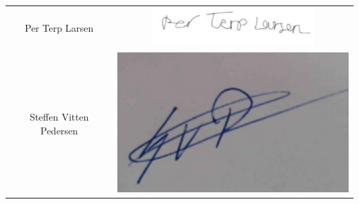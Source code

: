 \begin{center}
\begin{longtable}{cc}
Per Terp Larsen  &  \includegraphics[width = 5 cm]{./PNG/underskrifter/Per.PNG} \\
Steffen Vitten Pedersen & \includegraphics[width = 5 cm]{./PNG/underskrifter/Steffen.PNG}  \\
\end{longtable}
\end{center}


